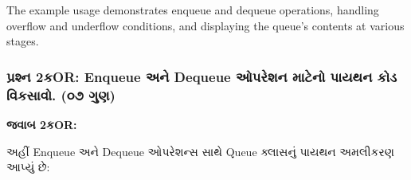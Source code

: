 The example usage demonstrates enqueue and dequeue operations, handling
overflow and underflow conditions, and displaying the queue's contents
at various stages.

\begin{Shaded}
\begin{Highlighting}[]
\end{Highlighting}
\end{Shaded}

\hypertarget{uxaaauxab0uxab6uxaa8-2uxa95or-enqueue-uxa85uxaa8-dequeue-uxa93uxaaauxab0uxab6uxaa8-uxaaeuxa9fuxaa8-uxaaauxaafuxaa5uxaa8-uxa95uxaa1-uxab5uxa95uxab8uxab5.-uxae6uxaed-uxa97uxaa3}{%
\subsubsection{પ્રશ્ન 2કOR: Enqueue અને Dequeue ઓપરેશન માટેનો પાયથન કોડ
વિકસાવો. (૦૭
ગુણ)}\label{uxaaauxab0uxab6uxaa8-2uxa95or-enqueue-uxa85uxaa8-dequeue-uxa93uxaaauxab0uxab6uxaa8-uxaaeuxa9fuxaa8-uxaaauxaafuxaa5uxaa8-uxa95uxaa1-uxab5uxa95uxab8uxab5.-uxae6uxaed-uxa97uxaa3}}

\textbf{જવાબ 2કOR:}

અહીં Enqueue અને Dequeue ઓપરેશન્સ સાથે Queue ક્લાસનું પાયથન અમલીકરણ આપ્યું છે:

